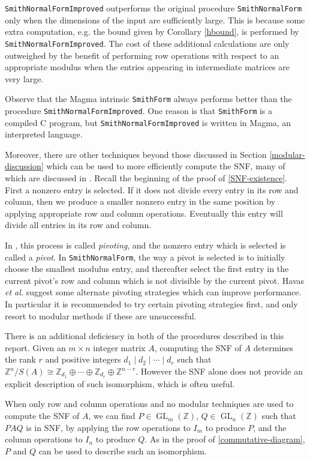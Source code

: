 \documentclass[12pt,a4paper,answers]{exam}
\newcommand{\Z}{\mathbb{Z}}
\DeclareMathOperator{\GL}{GL}
\theoremstyle{definition}
\begin{document}
\texttt{SmithNormalFormImproved} outperforms the original procedure \texttt{SmithNormalForm} only when the dimensions of the input are sufficiently large. This is because some extra computation, e.g. the bound given by Corollary \ref{hbound}, is performed by \texttt{SmithNormalFormImproved}. The cost of these additional calculations are only outweighed by the benefit of performing row operations with respect to an appropriate modulus when the entries appearing in intermediate matrices are very large.

Observe that the {\sc Magma} intrinsic \texttt{SmithForm} always performs better than the procedure \texttt{SmithNormalFormImproved}. One reason is that \texttt{SmithForm} is a compiled C program, but \texttt{SmithNormalFormImproved} is written in {\sc Magma}, an interpreted language.

Moreover, there are other techniques beyond those discussed in Section \ref{modular-discussion} which can be used to more efficiently compute the SNF, many of which are discussed in \cite{havas}. Recall the beginning of the proof of \autoref{SNF-existence}. First a nonzero entry is selected. If it does not divide every entry in its row and column, then we produce a smaller nonzero entry in the same position by applying appropriate row and column operations. Eventually this entry will divide all entries in its row and column.

In \cite{havas}, this process is called \emph{pivoting}, and the nonzero entry which is selected is called a \emph{pivot}. In \texttt{SmithNormalForm}, the way a pivot is selected is to initially choose the smallest modulus entry, and thereafter select the first entry in the current pivot's row and column which is not divisible by the current pivot. Havas \emph{et al.} \cite{havas} suggest some alternate pivoting strategies which can improve performance. In particular it is recommended to try certain pivoting strategies first, and only resort to modular methods if these are unsuccessful.

There is an additional deficiency in both of the procedures described in this report. Given an $m\times n$ integer matrix $A$, computing the SNF of $A$ determines the rank $r$ and positive integers $d_1\mid d_2\mid\cdots\mid d_r$ such that $\Z^n/S(A) \cong \Z_{d_1}\oplus\cdots\oplus\Z_{d_r}\oplus\Z^{n-r}$. However the SNF alone does not provide an explicit description of such isomorphism, which is often useful.

When only row and column operations and no modular techniques are used to compute the SNF of $A$, we can find $P\in\GL_m(\Z)$, $Q\in\GL_n(\Z)$ such that $PAQ$ is in SNF, by applying the row operations to $I_m$ to produce $P$, and the column operations to $I_n$ to produce $Q$. As in the proof of \autoref{commutative-diagram}, $P$ and $Q$ can be used to describe such an isomorphism.
\end{document}
